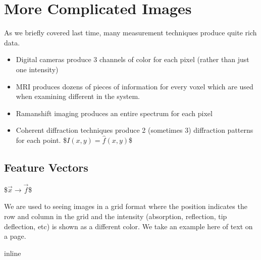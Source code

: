 \documentclass[letterpaper,10pt,english]{sphinxmanual}
\begin{document}
\noindent{}


\chapter{More Complicated Images}
\label{\detokenize{05-AdvancedSegmentation:more-complicated-images}}
\sphinxAtStartPar
As we briefly covered last time, many measurement techniques produce quite rich data.
\begin{itemize}
\item {} 
\sphinxAtStartPar
Digital cameras produce 3 channels of color for each pixel (rather than just one intensity)

\item {} 
\sphinxAtStartPar
MRI produces dozens of pieces of information for every voxel which are used when examining different  in the system.

\item {} 
\sphinxAtStartPar
Raman\sphinxhyphen{}shift imaging produces an entire spectrum for each pixel

\item {} 
\sphinxAtStartPar
Coherent diffraction techniques produce 2\sphinxhyphen{} (sometimes 3) diffraction patterns for each point.
\$\( I(x,y) = \hat{f}(x,y) \)\$

\end{itemize}


\section{Feature Vectors}
\label{\detokenize{05-AdvancedSegmentation:feature-vectors}}
\sphinxAtStartPar
{}
\$\( \vec{x} \rightarrow \vec{f} \)\$

\sphinxAtStartPar
We are used to seeing images in a grid format where the position indicates the row and column in the grid and the intensity (absorption, reflection, tip deflection, etc) is shown as a different color. We take an example here of text on a page.

\begin{sphinxVerbatim}[commandchars=\\\{\}]
 inline
   
   
   
   
   
     
\end{sphinxVerbatim}
\end{document}
